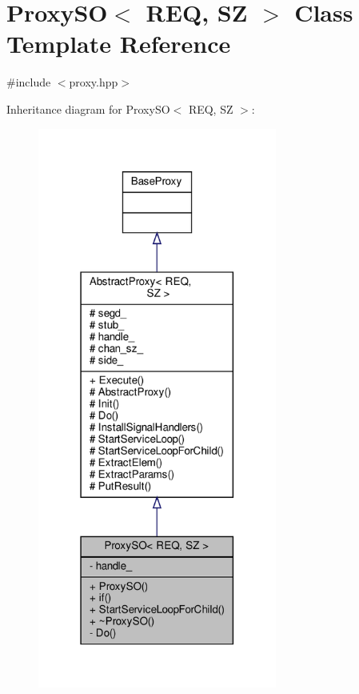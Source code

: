 \hypertarget{classProxySO}{}\section{Proxy\+SO$<$ R\+EQ, SZ $>$ Class Template Reference}
\label{classProxySO}


{\ttfamily \#include $<$proxy.\+hpp$>$}



Inheritance diagram for Proxy\+SO$<$ R\+EQ, SZ $>$\+:
\nopagebreak
\begin{figure}[H]
\begin{center}
\leavevmode
\includegraphics[width=223pt]{classProxySO__inherit__graph}
\end{center}
\end{figure}


